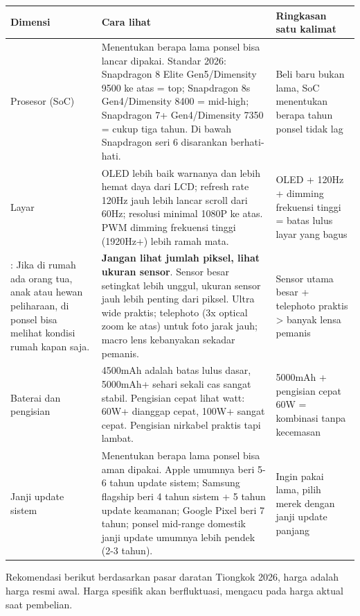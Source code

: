 \begin{center}
\begin{tabularx}{\linewidth}{|X|X|X|}
\hline
\textbf{Dimensi} & \textbf{Cara lihat} & \textbf{Ringkasan satu kalimat} \tabularnewline
\hline
Prosesor (SoC) & Menentukan berapa lama ponsel bisa lancar dipakai. Standar 2026: Snapdragon 8 Elite Gen5/Dimensity 9500 ke atas = top; Snapdragon 8s Gen4/Dimensity 8400 = mid-high; Snapdragon 7+ Gen4/Dimensity 7350 = cukup tiga tahun. Di bawah Snapdragon seri 6 disarankan berhati-hati. & Beli baru bukan lama, SoC menentukan berapa tahun ponsel tidak lag \tabularnewline
Layar & OLED lebih baik warnanya dan lebih hemat daya dari LCD; refresh rate 120Hz jauh lebih lancar scroll dari 60Hz; resolusi minimal 1080P ke atas. PWM dimming frekuensi tinggi (1920Hz+) lebih ramah mata. & OLED + 120Hz + dimming frekuensi tinggi = batas lulus layar yang bagus \tabularnewline
: Jika di rumah ada orang tua, anak atau hewan peliharaan, di ponsel bisa melihat kondisi rumah kapan saja. & \textbf{Jangan lihat jumlah piksel, lihat ukuran sensor}. Sensor besar setingkat lebih unggul, ukuran sensor jauh lebih penting dari piksel. Ultra wide praktis; telephoto (3x optical zoom ke atas) untuk foto jarak jauh; macro lens kebanyakan sekadar pemanis. & Sensor utama besar + telephoto praktis > banyak lensa pemanis \tabularnewline
Baterai dan pengisian & 4500mAh adalah batas lulus dasar, 5000mAh+ sehari sekali cas sangat stabil. Pengisian cepat lihat watt: 60W+ dianggap cepat, 100W+ sangat cepat. Pengisian nirkabel praktis tapi lambat. & 5000mAh + pengisian cepat 60W = kombinasi tanpa kecemasan \tabularnewline
Janji update sistem & Menentukan berapa lama ponsel bisa aman dipakai. Apple umumnya beri 5-6 tahun update sistem; Samsung flagship beri 4 tahun sistem + 5 tahun update keamanan; Google Pixel beri 7 tahun; ponsel mid-range domestik janji update umumnya lebih pendek (2-3 tahun). & Ingin pakai lama, pilih merek dengan janji update panjang \tabularnewline
\hline
\end{tabularx}
\end{center}


Rekomendasi berikut berdasarkan pasar daratan Tiongkok 2026, harga adalah harga resmi awal. Harga spesifik akan berfluktuasi, mengacu pada harga aktual saat pembelian.


